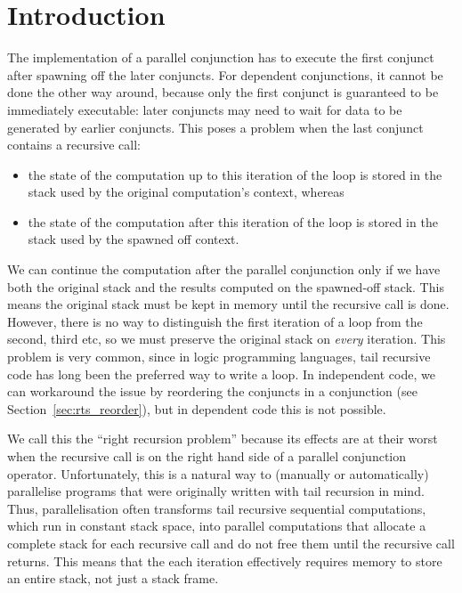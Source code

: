 \section{Introduction}
\label{sec:lc_intro}


The implementation of a parallel conjunction
has to execute the first conjunct after spawning off the later conjuncts.
For dependent conjunctions, it cannot be done the other way around,
because only the first conjunct is guaranteed to be immediately executable:
later conjuncts may need to wait for data to be generated by earlier
conjuncts.
This poses a problem when the last conjunct contains a recursive call:
\begin{itemize}
\item
the state of the computation up to this iteration of the loop
is stored in the stack used by the original computation's context,
whereas
\item
the state of the computation after this iteration of the loop
is stored in the stack used by the spawned off context.
\end{itemize}
We can continue the computation after the parallel conjunction
only if we have both the original stack
and the results computed on the spawned-off stack.
This means the original stack must be kept in memory
until the recursive call is done.
However, there is no way to distinguish
the first iteration of a loop from the second, third etc,
so we must preserve the original stack on \emph{every} iteration.
This problem is very common,
since in logic programming languages,
tail recursive code has long been the preferred way to write a loop.
In independent code,
we can workaround the issue by reordering the conjuncts
in a conjunction (see Section~\ref{sec:rts_reorder}),
but in dependent code this is not possible.

We call this the ``right recursion problem'' because its effects are at
their worst when the recursive call is on the right hand side of a
parallel conjunction operator.
Unfortunately,
this is a natural way to (manually or automatically) parallelise programs
that were originally written with tail recursion in mind.
Thus, parallelisation often
transforms tail recursive sequential computations,
which run in constant stack space,
into parallel computations
that allocate a complete stack for each recursive call
and do not free them until the recursive call returns.
This means that the each iteration effectively requires memory
to store an entire stack, not just a stack frame.

